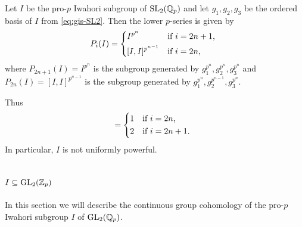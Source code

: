 \begin{theorem}
  Let $I$ be the pro-$p$ Iwahori subgroup of $\operatorname{SL}_{2}(\mathbb{Q}_{p})$ and let $g_{1},g_{2},g_{3}$ be the ordered basis of $I$ from \eqref{eq:gis-SL2}. Then the lower $p$-series is given by
  \begin{equation*}
    P_{i}(I) =
    \begin{dcases*}
      I^{p^{n}} & if $i = 2n+1$, \\
      [I,I]^{p^{n-1}} & if $i = 2n$,
    \end{dcases*}
  \end{equation*}
  where $P_{2n+1}(I) = I^{p^{n}}$ is the subgroup generated by $g_{1}^{p^{n}},g_{2}^{p^{n}},g_{3}^{p^{n}}$ and $P_{2n}(I) = [I,I]^{p^{n-1}}$ is the subgroup generated by $g_{1}^{p^{n}},g_{2}^{p^{n-1}},g_{3}^{p^{n}}$.

  Thus
  \begin{equation*}
    [P_{i}(G) : P_{i+1}(G)] =
    \begin{dcases*}
      1 & if $i = 2n$, \\
      2 & if $i = 2n+1$.
    \end{dcases*}
  \end{equation*}
  In particular, $I$ is not uniformly powerful.
\end{theorem}

\section{\texorpdfstring{$I \subseteq \operatorname{GL}_{2}(\mathbb{Z}_{p})$}{I in GL2(Zp)}}%
\label{sec:Iwa-GL2}

In this section we will describe the continuous group cohomology of the pro-$p$ Iwahori subgroup $I$ of $\operatorname{GL}_{2}(\mathbb{Q}_{p})$.

